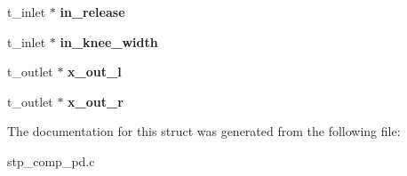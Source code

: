 \begin{DoxyCompactItemize}
\mbox{\label{structstp__comp__tilde_ad8fcdc98d2d6ea409896da0a329e5b66}} 
t\+\_\+inlet $\ast$ {\bfseries in\+\_\+release}
\item 
\mbox{\label{structstp__comp__tilde_a2e3cd0c507fd8996114857ea7992affa}} 
t\+\_\+inlet $\ast$ {\bfseries in\+\_\+knee\+\_\+width}
\item 
\mbox{\label{structstp__comp__tilde_ad9f0c2109e5cbfeb123e4842ccae455c}} 
t\+\_\+outlet $\ast$ {\bfseries x\+\_\+out\+\_\+l}
\item 
\mbox{\label{structstp__comp__tilde_a3e305add46f1bc284a01d7e0d400fb1f}} 
t\+\_\+outlet $\ast$ {\bfseries x\+\_\+out\+\_\+r}
\end{DoxyCompactItemize}


The documentation for this struct was generated from the following file\+:\begin{DoxyCompactItemize}
\item 
stp\+\_\+comp\+\_\+pd.\+c\end{DoxyCompactItemize}
